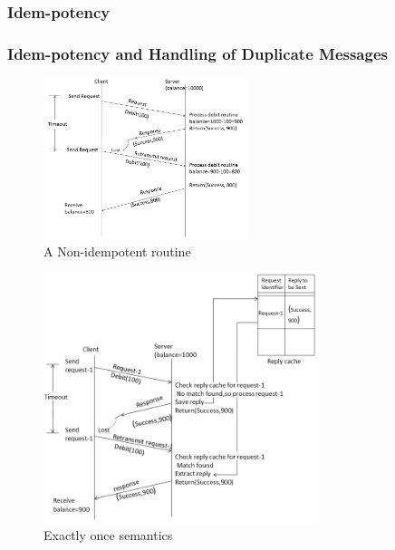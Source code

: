 \documentclass{beamer}
\begin{document}
\subsubsection{Idem-potency}
\begin{frame}[allowframebreaks]
	\frametitle{Idem-potency and Handling of Duplicate Messages}
	
	\begin{figure}
		\centering
		\includegraphics[width=6cm]{fig311.jpg}
		\caption{A Non-idempotent routine}
	\end{figure}
	\framebreak
	\begin{figure}
		\centering
		\includegraphics[width=8cm]{fig312.jpg}
		\caption{Exactly once semantics}
	\end{figure}
	\framebreak
\end{frame}
	
\end{document}
